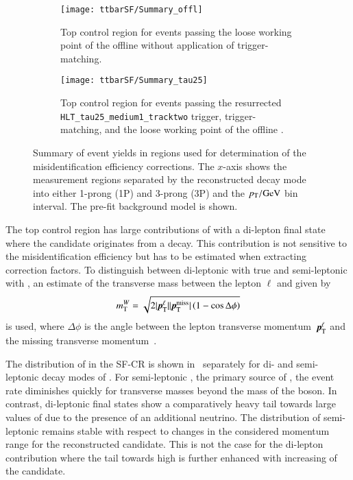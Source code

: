 \begin{figure}[htbp]
  \centering

  \begin{subfigure}[t]{.485\textwidth}
    \texttt{[image: ttbarSF/Summary\_offl]}
    \caption{Top control region for events passing the loose working
      point of the offline \tauid without application of
      trigger-matching.}
  \end{subfigure}\hfill%
  \begin{subfigure}[t]{.485\textwidth}
    \texttt{[image: ttbarSF/Summary\_tau25]}
    \caption{Top control region for events passing the resurrected
      \texttt{HLT\_tau25\_medium1\_tracktwo} trigger,
      trigger-matching, and the loose working point of the offline
      \tauid.}
  \end{subfigure}

  \caption{Summary of event yields in regions used for determination
    of the \jettotauhadvis misidentification efficiency
    corrections. The $x$-axis shows the measurement regions separated
    by the reconstructed decay mode into either 1-prong (1P) and
    3-prong (3P) \tauhadvis and the \tauhadvis $\pT /\si{\GeV}$ bin
    interval. The pre-fit background model is shown.}%
  \label{fig:ttbarsf_region_summary_prefit}
\end{figure}

The top control region has large contributions of \ttbar with a
di-lepton final state where the \tauhadvis candidate originates from a
\tauhad decay. This contribution is not sensitive to the
\jettotauhadvis misidentification efficiency but has to be estimated
when extracting correction factors. To distinguish between di-leptonic
\ttbar with true \tauhadvis and semi-leptonic \ttbar with
\faketauhadvis, an estimate of the transverse mass between the lepton
$\ell$ and \pTmissAbs given by
\begin{align*}
  \mTW = \sqrt{2 | \myvec{p}_{\text{T}}^{\ell} | | \pTmiss | \left( 1 - \cos \Delta\phi \right)}
\end{align*}
is used, where $\Delta \phi$ is the angle between the lepton
transverse momentum~$\myvec{p}_{\text{T}}^{\ell}$ and the missing
transverse momentum~\pTmiss.

The distribution of \mTW in the SF-CR is shown
in~ separately for di- and semi-leptonic
decay modes of \ttbar. For semi-leptonic \ttbar, the primary source of
\faketauhadvis, the event rate diminishes quickly for transverse
masses beyond the mass of the \PW boson. In contrast, di-leptonic
\ttbar final states show a comparatively heavy tail towards large
values of \mTW due to the presence of an additional neutrino. The \mTW
distribution of semi-leptonic \ttbar remains stable with respect to
changes in the considered momentum range for the reconstructed
\tauhadvis candidate. This is not the case for the di-lepton
contribution where the tail towards high \mTW is further enhanced with
increasing \pT of the \tauhadvis candidate.

